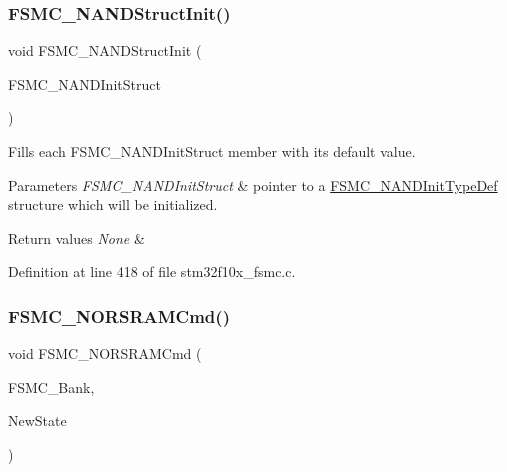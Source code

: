 \subsubsection{\texorpdfstring{F\+S\+M\+C\+\_\+\+N\+A\+N\+D\+Struct\+Init()}{FSMC\_NANDStructInit()}}
{\footnotesize\ttfamily void F\+S\+M\+C\+\_\+\+N\+A\+N\+D\+Struct\+Init (\begin{DoxyParamCaption}\item[{\hyperlink{struct_f_s_m_c___n_a_n_d_init_type_def}{F\+S\+M\+C\+\_\+\+N\+A\+N\+D\+Init\+Type\+Def} $\ast$}]{F\+S\+M\+C\+\_\+\+N\+A\+N\+D\+Init\+Struct }\end{DoxyParamCaption})}



Fills each F\+S\+M\+C\+\_\+\+N\+A\+N\+D\+Init\+Struct member with its default value. 


\begin{DoxyParams}{Parameters}
{\em F\+S\+M\+C\+\_\+\+N\+A\+N\+D\+Init\+Struct} & pointer to a \hyperlink{struct_f_s_m_c___n_a_n_d_init_type_def}{F\+S\+M\+C\+\_\+\+N\+A\+N\+D\+Init\+Type\+Def} structure which will be initialized. \\
\hline
\end{DoxyParams}

\begin{DoxyRetVals}{Return values}
{\em None} & \\
\hline
\end{DoxyRetVals}


Definition at line 418 of file stm32f10x\+\_\+fsmc.\+c.

\mbox{\label{group___f_s_m_c___exported___functions_gaf943f0f2680168d3a95a3c2c9f3eca2a}} 
\subsubsection{\texorpdfstring{F\+S\+M\+C\+\_\+\+N\+O\+R\+S\+R\+A\+M\+Cmd()}{FSMC\_NORSRAMCmd()}}
{\footnotesize\ttfamily void F\+S\+M\+C\+\_\+\+N\+O\+R\+S\+R\+A\+M\+Cmd (\begin{DoxyParamCaption}\item[{uint32\+\_\+t}]{F\+S\+M\+C\+\_\+\+Bank,  }\item[{\hyperlink{group___exported__types_gac9a7e9a35d2513ec15c3b537aaa4fba1}{Functional\+State}}]{New\+State }\end{DoxyParamCaption})}



